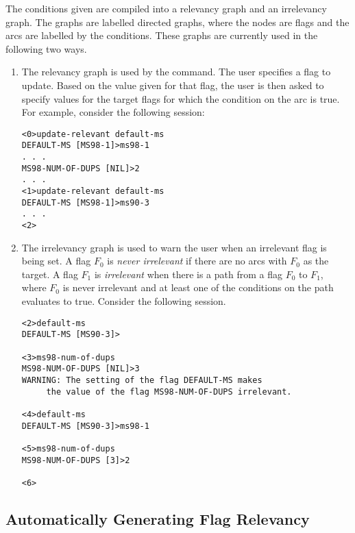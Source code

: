 The conditions given are compiled into a relevancy graph and an irrelevancy graph.
The graphs are labelled directed graphs, where the nodes are flags and the
arcs are labelled by the conditions.
These graphs are currently used in the following two ways.
\begin{enumerate}
\item The relevancy graph is used by the {\bf {}} command.
The user specifies a flag to update.  Based on the value given for that flag,
the user is then asked to specify values for the target flags for which the condition
on the arc is true.  
For example, consider the following session:
\begin{verbatim}
<0>update-relevant default-ms
DEFAULT-MS [MS98-1]>ms98-1
. . . 
MS98-NUM-OF-DUPS [NIL]>2
. . .
<1>update-relevant default-ms
DEFAULT-MS [MS98-1]>ms90-3
. . .
<2>
\end{verbatim}
\item The irrelevancy graph is used to warn the user when an irrelevant flag
is being set.  A flag $F_0$ is {\it never irrelevant}
if there are no arcs with $F_0$ as the target.
A flag $F_1$ is {\it irrelevant} when there is a path
from a flag $F_0$ to $F_1$, where $F_0$ is never irrelevant and
at least one of the conditions on the path evaluates to true.  
Consider the following session.
\begin{verbatim}
<2>default-ms
DEFAULT-MS [MS90-3]>

<3>ms98-num-of-dups
MS98-NUM-OF-DUPS [NIL]>3
WARNING: The setting of the flag DEFAULT-MS makes
     the value of the flag MS98-NUM-OF-DUPS irrelevant.

<4>default-ms
DEFAULT-MS [MS90-3]>ms98-1

<5>ms98-num-of-dups
MS98-NUM-OF-DUPS [3]>2

<6>
\end{verbatim}
\end{enumerate}

\subsection{Automatically Generating Flag Relevancy}

